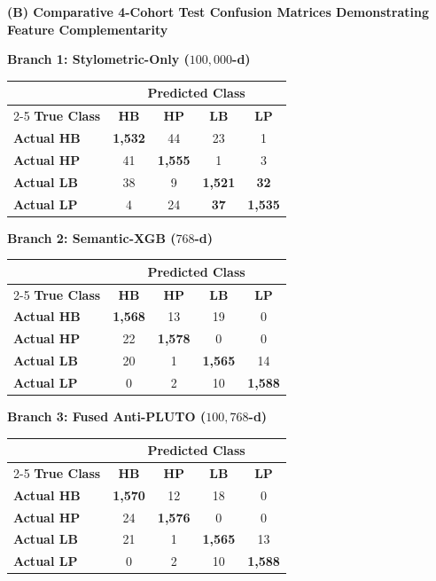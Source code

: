 \documentclass[journal]{IEEEtran}
\begin{document}
\begin{table}[!t]
\vspace{0.35cm}
\textbf{(B) Comparative 4-Cohort Test Confusion Matrices Demonstrating Feature Complementarity}\\[3pt]
\begin{minipage}[t]{0.32\textwidth}
\centering
\textbf{Branch 1: Stylometric-Only ($100{,}000$-d)}\\[2pt]
\footnotesize
\begin{tabular}{l c c c c}
\toprule
& \multicolumn{4}{c}{\textbf{Predicted Class}} \\
\cmidrule{2-5}
\textbf{True Class} & \textbf{HB} & \textbf{HP} & \textbf{LB} & \textbf{LP} \\
\midrule
\textbf{Actual HB} & \textbf{1,532} & 44 & 23 & 1 \\
\textbf{Actual HP} & 41 & \textbf{1,555} & 1 & 3 \\
\textbf{Actual LB} & 38 & 9 & \textbf{1,521} & \textbf{32} \\
\textbf{Actual LP} & 4 & 24 & \textbf{37} & \textbf{1,535} \\
\bottomrule
\end{tabular}
\end{minipage}\hfill
\begin{minipage}[t]{0.32\textwidth}
\centering
\textbf{Branch 2: Semantic-XGB ($768$-d)}\\[2pt]
\footnotesize
\begin{tabular}{l c c c c}
\toprule
& \multicolumn{4}{c}{\textbf{Predicted Class}} \\
\cmidrule{2-5}
\textbf{True Class} & \textbf{HB} & \textbf{HP} & \textbf{LB} & \textbf{LP} \\
\midrule
\textbf{Actual HB} & \textbf{1,568} & 13 & 19 & 0 \\
\textbf{Actual HP} & 22 & \textbf{1,578} & 0 & 0 \\
\textbf{Actual LB} & 20 & 1 & \textbf{1,565} & 14 \\
\textbf{Actual LP} & 0 & 2 & 10 & \textbf{1,588} \\
\bottomrule
\end{tabular}
\end{minipage}\hfill
\begin{minipage}[t]{0.32\textwidth}
\centering
\textbf{Branch 3: Fused Anti-PLUTO ($100{,}768$-d)}\\[2pt]
\footnotesize
\begin{tabular}{l c c c c}
\toprule
& \multicolumn{4}{c}{\textbf{Predicted Class}} \\
\cmidrule{2-5}
\textbf{True Class} & \textbf{HB} & \textbf{HP} & \textbf{LB} & \textbf{LP} \\
\midrule
\textbf{Actual HB} & \textbf{1,570} & 12 & 18 & 0 \\
\textbf{Actual HP} & 24 & \textbf{1,576} & 0 & 0 \\
\textbf{Actual LB} & 21 & 1 & \textbf{1,565} & 13 \\
\textbf{Actual LP} & 0 & 2 & 10 & \textbf{1,588} \\
\bottomrule
\end{tabular}
\end{minipage}


\end{table}
\end{document}
